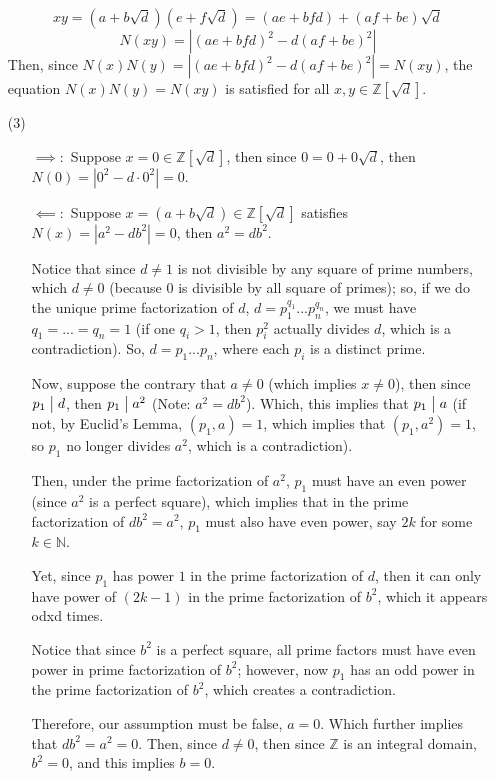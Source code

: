 \documentclass{article}
\begin{document}
\begin{itemize}
    $$xy=(a+b\sqrt{d})(e+f\sqrt{d})=(ae+bfd)+(af+be)\sqrt{d}$$
    $$N(xy)=|(ae+bfd)^2-d(af+be)^2|$$
    Then, since $N(x)N(y)=|(ae+bfd)^2-d(af+be)^2|=N(xy)$, the equation $N(x)N(y)=N(xy)$ is satisfied for all $x,y\in\mathbb{Z}[\sqrt{d}]$.

    \hfil

    \item[(3)] \begin{itemize}
        \item[$\implies:$] Suppose $x=0\in\mathbb{Z}[\sqrt{d}]$, then since $0=0+0\sqrt{d}$, then $N(0)=|0^2-d\cdot 0^2|=0$.
        \item[$\impliedby:$] Suppose $x=(a+b\sqrt{d})\in\mathbb{Z}[\sqrt{d}]$ satisfies $N(x)=|a^2-db^2|=0$, then $a^2=db^2$.
        
        Notice that since $d\neq 1$ is not divisible by any square of prime numbers, which $d\neq 0$ (because $0$ is divisible by all square of primes); so, if we do the unique prime factorization of $d$,
        $d=p_1^{q_1}...p_n^{q_n}$, we must have $q_1=...=q_n=1$ (if one $q_i>1$, then $p_i^2$ actually divides $d$, which is a contradiction). So, $d=p_1...p_n$, where each $p_i$ is a distinct prime.

        \hfil

        Now, suppose the contrary that $a\neq 0$ (which implies $x\neq 0$), then since $p_1\bigm | d$, then $p_1\bigm |a^2$ (Note: $a^2=db^2$).
        Which, this implies that $p_1\bigm |a$ (if not, by Euclid's Lemma, $(p_1,a)=1$, which implies that $(p_1,a^2)=1$, so $p_1$ no longer divides $a^2$, which is a contradiction).

        Then, under the prime factorization of $a^2$, $p_1$  must have an even power (since $a^2$ is a perfect square), which implies that in the prime factorization of $db^2=a^2$,
        $p_1$ must also have even power, say $2k$ for some $k\in\mathbb{N}$. 
        
        Yet, since $p_1$ has power $1$ in the prime factorization of $d$, then it can only have power of $(2k-1)$ in the prime factorization of $b^2$,
        which it appears odxd times. 

        Notice that since $b^2$ is a perfect square, all prime factors must have even power in prime factorization of $b^2$; however, now $p_1$ has an odd power in the prime factorization of $b^2$,
        which creates a contradiction.

        Therefore, our assumption must be false, $a=0$. Which further implies that $db^2=a^2=0$. Then, since $d\neq 0$, then since $\mathbb{Z}$ is an integral domain,
         $b^2=0$, and this implies $b=0$.


\end{itemize}
\end{itemize}
\end{document}
